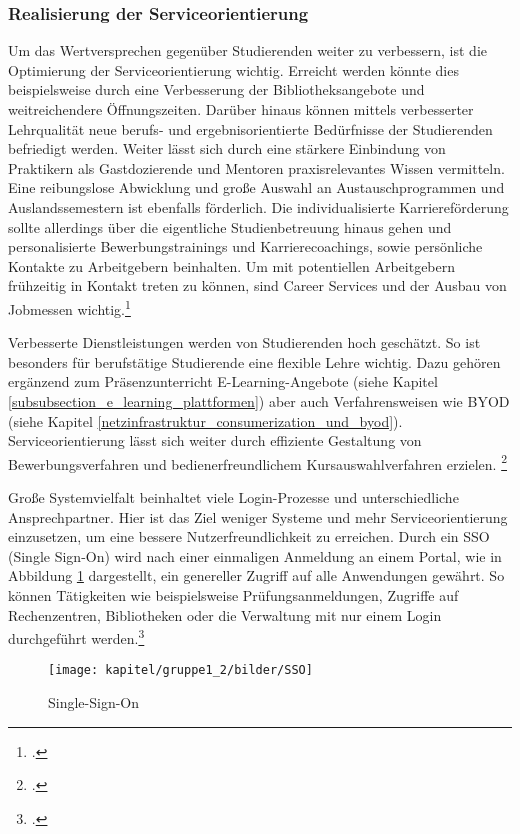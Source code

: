 \subsubsection{Realisierung der Serviceorientierung}
\label{realisierung_der_serviceorientierung}
Um das Wertversprechen gegenüber Studierenden weiter zu verbessern, ist die Optimierung der Serviceorientierung wichtig. Erreicht werden könnte dies beispielsweise durch eine Verbesserung der Bibliotheksangebote und weitreichendere Öffnungszeiten. Darüber hinaus können mittels verbesserter Lehrqualität neue berufs- und ergebnisorientierte Bedürfnisse der Studierenden befriedigt werden. Weiter lässt sich durch eine stärkere Einbindung von Praktikern als Gastdozierende und Mentoren praxisrelevantes Wissen vermitteln. Eine reibungslose Abwicklung und große Auswahl an Austauschprogrammen und Auslandssemestern ist ebenfalls förderlich. Die individualisierte Karriereförderung sollte allerdings über die eigentliche Studienbetreuung hinaus gehen und personalisierte Bewerbungstrainings und Karrierecoachings, sowie persönliche Kontakte zu Arbeitgebern beinhalten. Um mit potentiellen Arbeitgebern frühzeitig in Kontakt treten zu können, sind Career Services und der Ausbau von Jobmessen wichtig.\footcite[Vgl.][13]{schroeder_2011}

Verbesserte Dienstleistungen werden von Studierenden hoch geschätzt. So ist besonders für berufstätige Studierende eine flexible Lehre wichtig. Dazu gehören ergänzend zum Präsenzunterricht E-Learning-Angebote (siehe Kapitel \ref{subsubsection_e_learning_plattformen}) aber auch Verfahrensweisen wie BYOD (siehe Kapitel \ref{netzinfrastruktur_consumerization_und_byod}). Serviceorientierung lässt sich weiter durch effiziente Gestaltung von Bewerbungsverfahren und bedienerfreundlichem Kursauswahlverfahren erzielen. \footcite[Vgl.][18]{deutsche_wissenschaft_2010}

Große Systemvielfalt beinhaltet viele Login-Prozesse und unterschiedliche Ansprechpartner. Hier ist das Ziel weniger Systeme  und mehr Serviceorientierung einzusetzen, um eine bessere Nutzerfreundlichkeit zu erreichen. Durch ein SSO (Single Sign-On) wird nach einer einmaligen Anmeldung an einem Portal, wie in Abbildung \ref{fig_sso} dargestellt, ein genereller Zugriff auf alle Anwendungen gewährt. So können Tätigkeiten wie beispielsweise Prüfungsanmeldungen, Zugriffe auf Rechenzentren, Bibliotheken oder die Verwaltung mit nur einem Login durchgeführt werden.\footcite[Vgl.][81]{deutsche_wissenschaft_2010}

\begin{figure}[h!]
	\centering
	\texttt{[image: kapitel/gruppe1\_2/bilder/SSO]}
	\caption{Single-Sign-On\protect\footnotemark}
	\label{fig_sso}
\end{figure}



